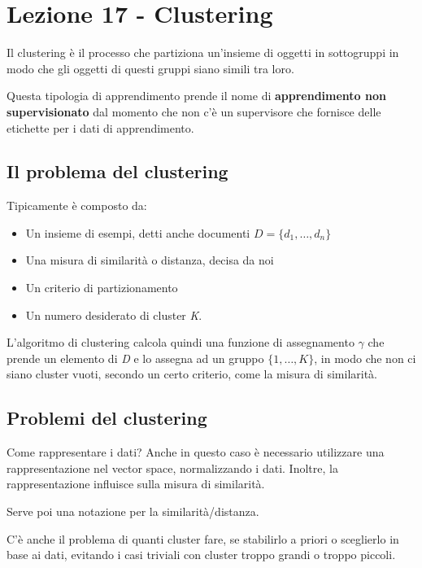 \section{Lezione 17 - Clustering}\label{lezione-17---clustering}

Il clustering è il processo che partiziona un'insieme di oggetti in
sottogruppi in modo che gli oggetti di questi gruppi siano simili tra
loro.

Questa tipologia di apprendimento prende il nome di
\textbf{apprendimento non supervisionato} dal momento che  non c'è un supervisore che fornisce delle etichette per i dati di apprendimento.

\subsection{Il problema del clustering}\label{il-problema-del-clustering}

Tipicamente è composto da:

\begin{itemize}
\item
  Un insieme di esempi, detti anche documenti $D = \{d_1, \ldots , d_n\}$
\item
  Una misura di similarità o distanza, decisa da noi
\item
  Un criterio di partizionamento
\item
  Un numero desiderato di cluster \emph{K}.
\end{itemize}

L'algoritmo di clustering calcola quindi una funzione di assegnamento $\gamma$
che prende un elemento di \emph{D} e lo assegna ad un gruppo
$\{1, \ldots , K\}$, in modo che non ci siano cluster vuoti, secondo un certo criterio, come la misura di similarità.

\subsection{Problemi del clustering}\label{problemi-del-clustering}

Come rappresentare i dati? Anche in questo caso è necessario utilizzare
una rappresentazione nel vector space, normalizzando i dati. Inoltre, la
rappresentazione influisce sulla misura di similarità.

Serve poi una notazione per la similarità/distanza.

C'è anche il problema di quanti cluster fare, se stabilirlo a priori o
sceglierlo in base ai dati, evitando i casi triviali con cluster troppo
grandi o troppo piccoli.

